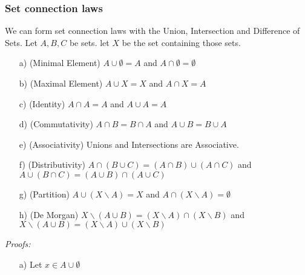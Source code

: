 \documentclass[]{scrbook}
\begin{document}
\subsubsection{Set connection laws}
We can form set connection laws with the Union, Intersection and Difference of Sets. Let $A,B,C$ be sets. let $X$ be the set containing those sets.
\begin{itemize}
	\item [a)](Minimal Element) $A\cup \emptyset = A$ and $A\cap\emptyset = \emptyset$
	\item [b)](Maximal Element) $A\cup X = X$ and $A\cap X = A$
	\item [c)](Identity) $A\cap A = A$ and $A\cup A = A$
	\item [d)](Commutativity) $A\cap B = B\cap A$ and $A\cup B = B\cup A$
	\item [e)](Associativity) Unions and Intersections are Associative.
	\item [f)](Distributivity) $A\cap (B\cup C) = (A\cap B) \cup (A\cap C)$ and $A\cup(B\cap C) = (A\cup B) \cap (A\cup C)$
	\item [g)](Partition) $A\cup (X\backslash A) = X$ and $A\cap(X\backslash A) = \emptyset$
	\item [h)](De Morgan) $X\backslash (A\cup B) = (X\backslash A)\cap(X\backslash B)$ and $X\backslash (A\cup B) = (X\backslash A) \cup (X\backslash B)$
\end{itemize}
\textit{Proofs: }
\begin{itemize}
	\item[a)] Let $x\in A\cup\emptyset$ 
	
\end{itemize}
\end{document}
